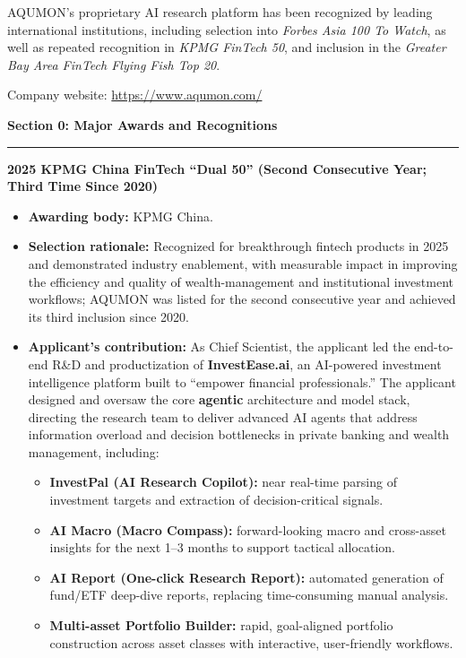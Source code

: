 \documentclass[11pt]{article}
\newcommand{\CVSection}[1]{\vspace{6pt}\textbf{\large #1}\par\vspace{2pt}\hrule\vspace{6pt}}
\newenvironment{tightitemize}{%
  \begin{itemize}[leftmargin=*,nosep,topsep=2pt]
}{\end{itemize}}
\begin{document}
AQUMON’s proprietary AI research platform has been recognized by leading international institutions, including selection into \emph{Forbes Asia 100 To Watch}, as well as repeated recognition in \emph{KPMG FinTech 50}, and inclusion in the \emph{Greater Bay Area FinTech Flying Fish Top 20}.

Company website: \href{https://www.aqumon.com/}{https://www.aqumon.com/}




\CVSection{Section 0: Major Awards and Recognitions}


\noindent\textbf{2025 \quad KPMG China FinTech ``Dual 50'' (Second Consecutive Year; Third Time Since 2020)}\\
\begin{tightitemize}
  \item \textbf{Awarding body:} KPMG China.
  \item \textbf{Selection rationale:} Recognized for breakthrough fintech products in 2025 and demonstrated industry enablement, with measurable impact in improving the efficiency and quality of wealth-management and institutional investment workflows; AQUMON was listed for the second consecutive year and achieved its third inclusion since 2020.
  \item \textbf{Applicant's contribution:} As Chief Scientist, the applicant led the end-to-end R\&D and productization of \textbf{InvestEase.ai}, an AI-powered investment intelligence platform built to ``empower financial professionals.'' The applicant designed and oversaw the core \textbf{agentic} architecture and model stack, directing the research team to deliver advanced AI agents that address information overload and decision bottlenecks in private banking and wealth management, including:
  \begin{tightitemize}
    \item \textbf{InvestPal (AI Research Copilot):} near real-time parsing of investment targets and extraction of decision-critical signals.
    \item \textbf{AI Macro (Macro Compass):} forward-looking macro and cross-asset insights for the next 1--3 months to support tactical allocation.
    \item \textbf{AI Report (One-click Research Report):} automated generation of fund/ETF deep-dive reports, replacing time-consuming manual analysis.
    \item \textbf{Multi-asset Portfolio Builder:} rapid, goal-aligned portfolio construction across asset classes with interactive, user-friendly workflows.

\end{tightitemize}
\end{tightitemize}
\end{document}
